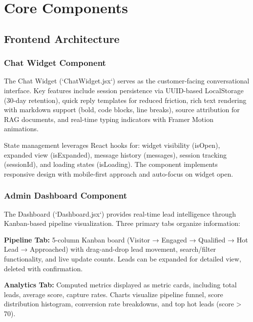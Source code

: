 \documentclass[10pt,twocolumn,a4paper]{article}
\begin{document}

\section{Core Components}

\subsection{Frontend Architecture}

\subsubsection{Chat Widget Component}

The Chat Widget (`ChatWidget.jsx`) serves as the customer-facing conversational interface. Key features include session persistence via UUID-based LocalStorage (30-day retention), quick reply templates for reduced friction, rich text rendering with markdown support (bold, code blocks, line breaks), source attribution for RAG documents, and real-time typing indicators with Framer Motion animations.

State management leverages React hooks for: widget visibility (isOpen), expanded view (isExpanded), message history (messages), session tracking (sessionId), and loading states (isLoading). The component implements responsive design with mobile-first approach and auto-focus on widget open.

\subsubsection{Admin Dashboard Component}

The Dashboard (`Dashboard.jsx`) provides real-time lead intelligence through Kanban-based pipeline visualization. Three primary tabs organize information:

\textbf{Pipeline Tab:} 5-column Kanban board (Visitor → Engaged → Qualified → Hot Lead → Approached) with drag-and-drop lead movement, search/filter functionality, and live update counts. Leads can be expanded for detailed view, deleted with confirmation.

\textbf{Analytics Tab:} Computed metrics displayed as metric cards, including total leads, average score, capture rates. Charts visualize pipeline funnel, score distribution histogram, conversion rate breakdowns, and top hot leads (score > 70).
\end{document}
